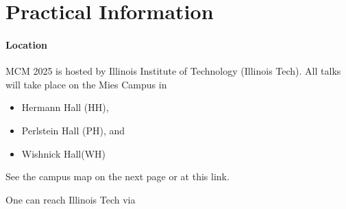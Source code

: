 


\chapter{Practical Information}


% 
% 
% 
% 
% 
% 




\subsubsection{Location}
MCM 2025 is hosted by Illinois Institute of Technology (Illinois Tech).  All talks will take place on the Mies Campus in 
\begin{itemize}
	\item Hermann Hall (HH),
	\item Perlstein Hall (PH), and
	\item Wishnick Hall(WH)
\end{itemize}
See the campus map on the next page or at this link.  


One can reach Illinois Tech via 

\newpage


